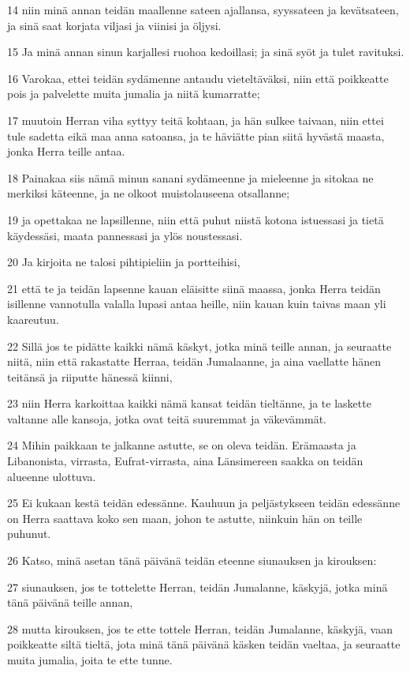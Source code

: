 \par 14 niin minä annan teidän maallenne sateen ajallansa, syyssateen ja kevätsateen, ja sinä saat korjata viljasi ja viinisi ja öljysi.
\par 15 Ja minä annan sinun karjallesi ruohoa kedoillasi; ja sinä syöt ja tulet ravituksi.
\par 16 Varokaa, ettei teidän sydämenne antaudu vieteltäväksi, niin että poikkeatte pois ja palvelette muita jumalia ja niitä kumarratte;
\par 17 muutoin Herran viha syttyy teitä kohtaan, ja hän sulkee taivaan, niin ettei tule sadetta eikä maa anna satoansa, ja te häviätte pian siitä hyvästä maasta, jonka Herra teille antaa.
\par 18 Painakaa siis nämä minun sanani sydämeenne ja mieleenne ja sitokaa ne merkiksi käteenne, ja ne olkoot muistolauseena otsallanne;
\par 19 ja opettakaa ne lapsillenne, niin että puhut niistä kotona istuessasi ja tietä käydessäsi, maata pannessasi ja ylös noustessasi.
\par 20 Ja kirjoita ne talosi pihtipieliin ja portteihisi,
\par 21 että te ja teidän lapsenne kauan eläisitte siinä maassa, jonka Herra teidän isillenne vannotulla valalla lupasi antaa heille, niin kauan kuin taivas maan yli kaareutuu.
\par 22 Sillä jos te pidätte kaikki nämä käskyt, jotka minä teille annan, ja seuraatte niitä, niin että rakastatte Herraa, teidän Jumalaanne, ja aina vaellatte hänen teitänsä ja riiputte hänessä kiinni,
\par 23 niin Herra karkoittaa kaikki nämä kansat teidän tieltänne, ja te laskette valtanne alle kansoja, jotka ovat teitä suuremmat ja väkevämmät.
\par 24 Mihin paikkaan te jalkanne astutte, se on oleva teidän. Erämaasta ja Libanonista, virrasta, Eufrat-virrasta, aina Länsimereen saakka on teidän alueenne ulottuva.
\par 25 Ei kukaan kestä teidän edessänne. Kauhuun ja peljästykseen teidän edessänne on Herra saattava koko sen maan, johon te astutte, niinkuin hän on teille puhunut.
\par 26 Katso, minä asetan tänä päivänä teidän eteenne siunauksen ja kirouksen:
\par 27 siunauksen, jos te tottelette Herran, teidän Jumalanne, käskyjä, jotka minä tänä päivänä teille annan,
\par 28 mutta kirouksen, jos te ette tottele Herran, teidän Jumalanne, käskyjä, vaan poikkeatte siltä tieltä, jota minä tänä päivänä käsken teidän vaeltaa, ja seuraatte muita jumalia, joita te ette tunne.
